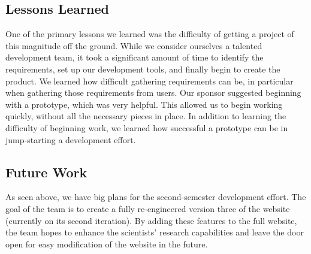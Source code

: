 \documentclass[12pt]{article}
\begin{document}
\begin{spacing}{1.5}
\subsection{Lessons Learned}
One of the primary lessons we learned was the difficulty of getting a project of this magnitude off the ground. While we consider ourselves a talented development team, it took a significant amount of time to identify the requirements, set up our development tools, and finally begin to create the product. We learned how difficult gathering requirements can be, in particular when gathering those requirements from users. Our sponsor suggested beginning with a prototype, which was very helpful. This allowed us to begin working quickly, without all the necessary pieces in place. In addition to learning the difficulty of beginning work, we learned how successful a prototype can be in jump-starting a development effort.
\subsection{Future Work}
As seen above, we have big plans for the second-semester development effort. The goal of the team is to create a fully re-engineered version three of the website (currently on its second iteration). By adding these features to the full website, the team hopes to enhance the scientists' research capabilities and leave the door open for easy modification of the website in the future.

\end{spacing}
\end{document}
